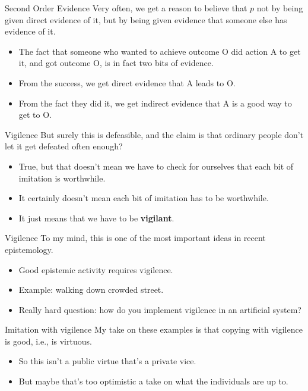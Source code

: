 \documentclass[
  ignorenonframetext,
]{beamer}
\providecommand{\tightlist}{%
  \setlength{\itemsep}{0pt}\setlength{\parskip}{0pt}}
\begin{document}
\begin{frame}{Second Order Evidence}
\protect\hypertarget{second-order-evidence}{}
Very often, we get a reason to believe that \(p\) not by being given
direct evidence of it, but by being given evidence that someone else has
evidence of it.

\begin{itemize}
\tightlist
\item
  The fact that someone who wanted to achieve outcome O did action A to
  get it, and got outcome O, is in fact two bits of evidence.
\item
  From the success, we get direct evidence that A leads to O.
\item
  From the fact they did it, we get indirect evidence that A is a good
  way to get to O.
\end{itemize}
\end{frame}

\begin{frame}{Vigilence}
\protect\hypertarget{vigilence}{}
But surely this is defeasible, and the claim is that ordinary people
don't let it get defeated often enough?

\begin{itemize}
\tightlist
\item
  True, but that doesn't mean we have to check for ourselves that each
  bit of imitation is worthwhile.
\item
  It certainly doesn't mean each bit of imitation has to be worthwhile.
\item
  It just means that we have to be \textbf{vigilant}.
\end{itemize}
\end{frame}

\begin{frame}{Vigilence}
\protect\hypertarget{vigilence-1}{}
To my mind, this is one of the most important ideas in recent
epistemology.

\begin{itemize}
\tightlist
\item
  Good epistemic activity requires vigilence.
\item
  Example: walking down crowded street.
\item
  Really hard question: how do you implement vigilence in an artificial
  system?
\end{itemize}
\end{frame}

\begin{frame}{Imitation with vigilence}
\protect\hypertarget{imitation-with-vigilence}{}
My take on these examples is that copying with vigilence is good, i.e.,
is virtuous.

\begin{itemize}
\tightlist
\item
  So this isn't a public virtue that's a private vice.
\item
  But maybe that's too optimistic a take on what the individuals are up
  to.
\end{itemize}
\end{frame}
\end{document}
